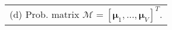 \scriptsize
\begin{tabular}[t]{l}
 (d) Prob. matrix \tiny $\mathcal{M}=[\bm{\mu}_1,\ldots, \bm{\mu}_V]^T$.
\end{tabular}
